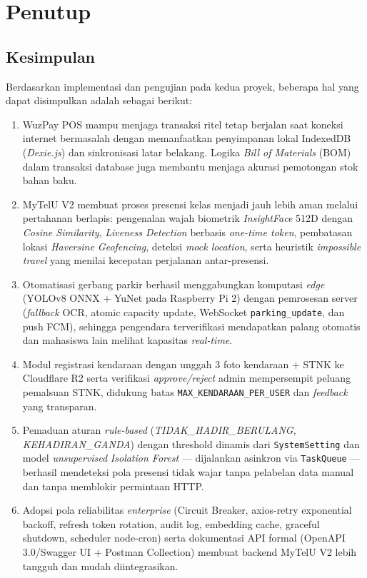 \documentclass[12pt,titlepage,a4paper]{report}
\begin{document}
\chapter{Penutup}

\section{Kesimpulan}
Berdasarkan implementasi dan pengujian pada kedua proyek, beberapa hal yang dapat disimpulkan adalah sebagai berikut:
\begin{enumerate}
    \item WuzPay POS mampu menjaga transaksi ritel tetap berjalan saat koneksi internet bermasalah dengan memanfaatkan penyimpanan lokal IndexedDB (\textit{Dexie.js}) dan sinkronisasi latar belakang. Logika \textit{Bill of Materials} (BOM) dalam transaksi database juga membantu menjaga akurasi pemotongan stok bahan baku.
    \item MyTelU V2 membuat proses presensi kelas menjadi jauh lebih aman melalui pertahanan berlapis: pengenalan wajah biometrik \textit{InsightFace} 512D dengan \textit{Cosine Similarity}, \textit{Liveness Detection} berbasis \textit{one-time token}, pembatasan lokasi \textit{Haversine Geofencing}, deteksi \textit{mock location}, serta heuristik \textit{impossible travel} yang menilai kecepatan perjalanan antar-presensi.
    \item Otomatisasi gerbang parkir berhasil menggabungkan komputasi \textit{edge} (YOLOv8 ONNX + YuNet pada Raspberry Pi 2) dengan pemrosesan server (\textit{fallback} OCR, atomic capacity update, WebSocket \texttt{parking\_update}, dan push FCM), sehingga pengendara terverifikasi mendapatkan palang otomatis dan mahasiswa lain melihat kapasitas \textit{real-time}.
    \item Modul registrasi kendaraan dengan unggah 3 foto kendaraan + STNK ke Cloudflare R2 serta verifikasi \textit{approve/reject} admin mempersempit peluang pemalsuan STNK, didukung batas \texttt{MAX\_KENDARAAN\_PER\_USER} dan \textit{feedback} yang transparan.
    \item Pemaduan aturan \textit{rule-based} (\textit{TIDAK\_HADIR\_BERULANG}, \textit{KEHADIRAN\_GANDA}) dengan threshold dinamis dari \texttt{SystemSetting} dan model \textit{unsupervised} \textit{Isolation Forest} --- dijalankan asinkron via \texttt{TaskQueue} --- berhasil mendeteksi pola presensi tidak wajar tanpa pelabelan data manual dan tanpa memblokir permintaan HTTP.
    \item Adopsi pola reliabilitas \textit{enterprise} (Circuit Breaker, axios-retry exponential backoff, refresh token rotation, audit log, embedding cache, graceful shutdown, scheduler node-cron) serta dokumentasi API formal (OpenAPI 3.0/Swagger UI + Postman Collection) membuat backend MyTelU V2 lebih tangguh dan mudah diintegrasikan.
\end{enumerate}
\end{document}
